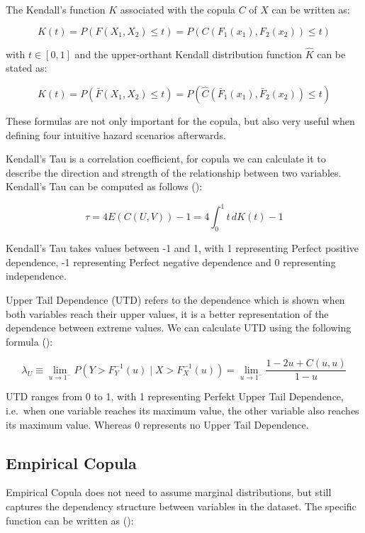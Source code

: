 \documentclass[
]{krantz}
\begin{document}
The Kendall's function \(K\) associated with the copula \(C\) of \(X\) can be written as:

\[K(t) = P\left(F(X_1, X_2) \leq t\right) = P\left(C\left(F_1(x_1), F_2(x_2)\right) \leq t\right) \tag{4} \]

with \(t \in [0,1]\) and the upper-orthant Kendall distribution function \(\hat{K}\) can be stated as:

\[\hat{K}(t) = P\left(\bar{F}(X_1, X_2) \leq t\right) = P\left(\hat{C}\left(\bar{F}_1(x_1), \bar{F}_2(x_2)\right) \leq t\right) \tag{5} \]

These formulas are not only important for the copula, but also very useful when defining four intuitive hazard scenarios afterwards.

Kendall's Tau is a correlation coefficient, for copula we can calculate it to describe the direction and strength of the relationship between two variables. Kendall's Tau can be computed as follows (\citet{barbe1996b}):

\[\tau = 4E(C(U, V)) - 1= 4 \int_{0}^{1} t \, dK(t) - 1 \tag{6} \]

Kendall's Tau takes values between -1 and 1, with 1 representing Perfect positive dependence, -1 representing Perfect negative dependence and 0 representing independence.

Upper Tail Dependence (UTD) refers to the dependence which is shown when both variables reach their upper values, it is a better representation of the dependence between extreme values. We can calculate UTD using the following formula (\citet{fischer2006}):

\[\lambda_U \equiv \lim_{{u \to 1^-}} P(Y > F_Y^{-1}(u) \mid X > F_X^{-1}(u))= \lim_{u \to 1^{-}} \frac{1 - 2u + C(u, u)}{1 - u} \tag{7} \]

UTD ranges from 0 to 1, with 1 representing Perfekt Upper Tail Dependence, i.e.~when one variable reaches its maximum value, the other variable also reaches its maximum value. Whereas 0 represents no Upper Tail Dependence.

\subsection{Empirical Copula}\label{empirical-shiyu}

Empirical Copula does not need to assume marginal distributions, but still captures the dependency structure between variables in the dataset. The specific function can be written as (\citet{bucher2013}):
\end{document}
